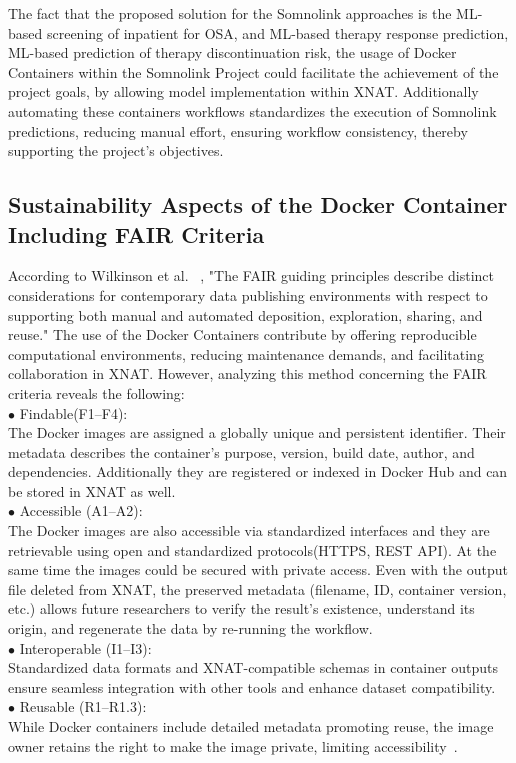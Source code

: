 The fact that the proposed solution for the Somnolink approaches is the ML-based screening of inpatient for OSA, and ML-based therapy response prediction, ML-based prediction of therapy discontinuation risk, the usage of Docker Containers within the Somnolink Project could facilitate the achievement of the project goals, by allowing model implementation within XNAT. Additionally  automating these containers workflows standardizes the execution of Somnolink predictions, reducing manual effort, ensuring workflow consistency, thereby supporting the project's objectives.\\









\subsection{Sustainability Aspects of the Docker Container Including FAIR Criteria}

According to Wilkinson et al. ~\cite{FAIR}, "The FAIR guiding principles describe distinct considerations for contemporary data publishing environments with respect to supporting both manual and automated deposition, exploration, sharing, and reuse."
The use of the Docker Containers contribute by offering reproducible computational environments, reducing maintenance demands, and facilitating collaboration in XNAT. However, analyzing this method concerning the FAIR criteria reveals the following:\\
$\bullet$ Findable(F1–F4):\\
The Docker images are assigned a globally unique and persistent identifier. Their metadata describes the container’s purpose, version, build date, author, and dependencies. Additionally they are registered or indexed in Docker Hub and can be stored in XNAT as well.\\
$\bullet$ Accessible (A1–A2):\\
The Docker images are also accessible via standardized interfaces and they are retrievable using open and standardized protocols(HTTPS, REST API). At the same time the images could be secured with private access. Even with the output file deleted from XNAT, the preserved metadata (filename, ID, container version, etc.) allows future researchers to verify the result's existence, understand its origin, and regenerate the data by re-running the workflow.\\
$\bullet$ Interoperable (I1–I3): \\
Standardized data formats and XNAT-compatible schemas in container outputs ensure seamless integration with other tools and enhance dataset compatibility.\\
$\bullet$ Reusable (R1–R1.3):\\
While Docker containers include detailed metadata promoting reuse, the image owner retains the right to make the image private, limiting accessibility~\cite{FAIR}.











